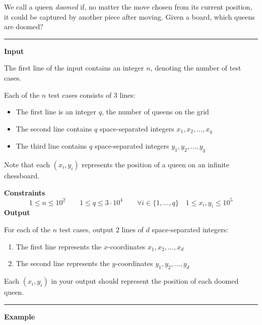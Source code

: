 We call a queen \textit{doomed} if, no matter the move chosen from its current position, it could be captured by another piece after moving.
Given a board, which queens are doomed?
\vspace{8pt}
\hrule

\textbf{Input}

The first line of the input contains an integer $n$, denoting the number of test cases.

Each of the $n$ test cases consists of 3 lines:
\begin{itemize}
    \item The first line is an integer $q$, the number of queens on the grid
    \item The second line contains $q$ space-separated integers $x_1, x_2, \dots, x_q$
    \item The third line contains $q$ space-separated integers $y_1, y_2, \dots, y_q$
\end{itemize}

Note that each $(x_i, y_i)$ represents the position of a queen on an infinite chessboard.

\textbf{Constraints}
\begin{equation*}
    1 \leq n \leq 10^2 \qquad
    1 \leq q \leq 3 \cdot 10^4 \qquad
    \forall i \in \{1, \dots, q\} \quad 1 \leq x_i, y_i \leq 10^5
\end{equation*}
\textbf{Output}

For each of the $n$ test cases, output 2 lines of $d$ space-separated integers:
\begin{enumerate}
    \item The first line represents the $x$-coordinates $x_1, x_2, \dots, x_d$
    \item The second line represents the $y$-coordinates $y_1, y_2, \dots, y_d$
\end{enumerate}

Each $(x_i, y_i)$ in your output should represent the position of each doomed queen.

\vspace{8pt}
\hrule

\newpage

\textbf{Example}

